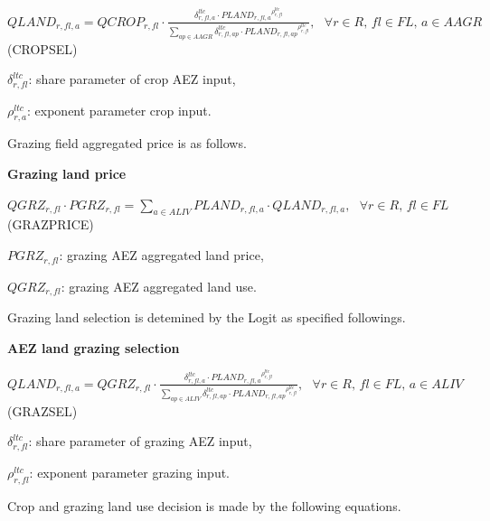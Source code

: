 \documentclass[10pt,a4paper,titlepage,dvipdfmx]{book}
\begin{document}
\begin{center}$QLAND_{r,fl,a}=QCROP_{r,fl}\cdot \frac{\delta _{r,fl,a}^{ltc}\cdot PLAN{D_{r,fl,a}}^{\rho _{r,fl}^{ltc}}}{\sum _{ap\in AAGR}\delta _{r,fl,ap}^{ltc}\cdot PLAN{D_{r,fl,ap}}^{\rho _{r,fl}^{ltc}}},\,\,\,\,\forall r\in R,\,fl\in FL,\,a\in AAGR$ (CROPSEL)
\end{center}

\begin{flushleft}
$\delta _{r,fl}^{ltc}$: share parameter of crop AEZ input,

$\rho _{r,a}^{ltc}$: exponent parameter crop input.
\end{flushleft}

Grazing field aggregated price is as follows.

\begin{flushleft}\textbf{Grazing land price}\end{flushleft}


\begin{center}$QGRZ_{r,fl}\cdot PGRZ_{r,fl}=\sum _{a\in ALIV}PLAND_{r,fl,a}\cdot QLAND_{r,fl,a},\,\,\,\,\forall r\in R,\,fl\in FL$ (GRAZPRICE)
\end{center}

\begin{flushleft}
$PGRZ_{r,fl}$: grazing AEZ aggregated land price,

$QGRZ_{r,fl}$: grazing AEZ aggregated land use.
\end{flushleft}

Grazing land selection is detemined by the Logit as specified followings.

\begin{flushleft}\textbf{AEZ land grazing selection}\end{flushleft}


\begin{center}$QLAND_{r,fl,a}=QGRZ_{r,fl}\cdot \frac{\delta _{r,fl,a}^{ltc}\cdot PLAN{D_{r,fl,a}}^{\rho _{r,fl}^{ltc}}}{\sum _{ap\in ALIV}\delta _{r,fl,ap}^{ltc}\cdot PLAN{D_{r,fl,ap}}^{\rho _{r,fl}^{ltc}}},\,\,\,\,\forall r\in R,\,fl\in FL,\,a\in ALIV$ (GRAZSEL)
\end{center}

\begin{flushleft}
$\delta _{r,fl}^{ltc}$: share parameter of grazing AEZ input,

$\rho _{r,fl}^{ltc}$: exponent parameter grazing input.
\end{flushleft}

Crop and grazing land use decision is made by the following equations.
\end{document}
